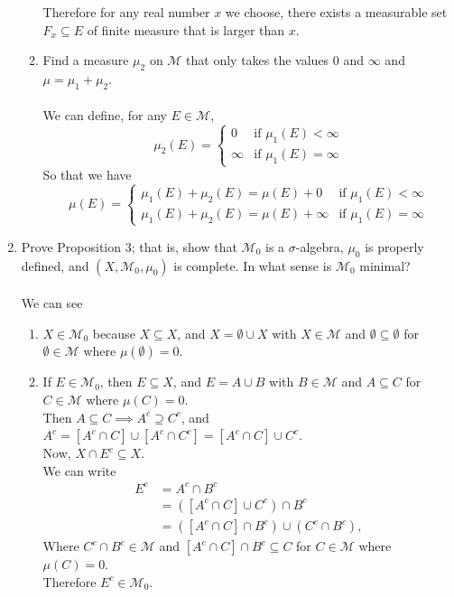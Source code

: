 \begin{enumerate}
\begin{enumerate}[label=(\roman*),align=left]
		Therefore for any real number $x$ we choose, there exists a measurable set $F_x\subseteq E$ of finite measure that is larger than $x$.  
		\item Find a measure $\mu_2$ on $\mathcal{M}$ that only takes the values $0$ and $\infty$ and $\mu=\mu_1+\mu_2$.\\
		\\We can define, for any $E\in\mathcal{M}$, 
		\[
			\mu_2(E)=
			\begin{cases}
				0&\text{if }\mu_1(E)<\infty\\
				\infty&\text{if }\mu_1(E)=\infty
			\end{cases}
		\]
		So that we have
		\[
			\mu(E)=
			\begin{cases}
				\mu_1(E)+\mu_2(E)=\mu(E)+0&\text{if }\mu_1(E)<\infty\\
				\mu_1(E)+\mu_2(E)=\mu(E)+\infty&\text{if }\mu_1(E)=\infty
			\end{cases}
		\]
	\end{enumerate}
	\item Prove Proposition 3; that is, show that $\mathcal{M}_0$ is a $\sigma$-algebra, $\mu_0$ is properly defined, and $(X,\mathcal{M}_0,\mu_0)$ is complete. In what sense is $\mathcal{M}_0$ minimal?\\
	\\We can see
	\begin{enumerate}[label=(\roman*),align=left]
		\item $X\in\mathcal{M}_0$ because $X\subseteq X$, and $X=\emptyset\cup X$ with $X\in\mathcal{M}$ and $\emptyset\subseteq\emptyset$ for $\emptyset\in\mathcal{M}$ where $\mu(\emptyset)=0$.
		\item If $E\in\mathcal{M}_0$, then $E\subseteq X$, and $E=A\cup B$ with $B\in\mathcal{M}$ and $A\subseteq C$ for $C\in\mathcal{M}$ where $\mu(C)=0$.\\
		Then $A\subseteq C\implies A^c\supseteq C^c$, and $A^c=[A^c\cap C]\cup[A^c\cap C^c]=[A^c\cap C]\cup C^c$.
		\\Now, $X\cap E^c\subseteq X$.
		\\We can write
		\begin{align*}
			E^c&=A^c\cap B^c\\
			&=([A^c\cap C]\cup C^c)\cap B^c\\
			&=([A^c\cap C]\cap B^c)\cup (C^c\cap B^c),
		\end{align*}
		Where $C^c\cap B^c\in\mathcal{M}$ and $[A^c\cap C]\cap B^c\subseteq C$ for $C\in\mathcal{M}$ where $\mu(C)=0$.
		\\Therefore $E^c\in\mathcal{M}_0$.

\end{enumerate}
\end{enumerate}
